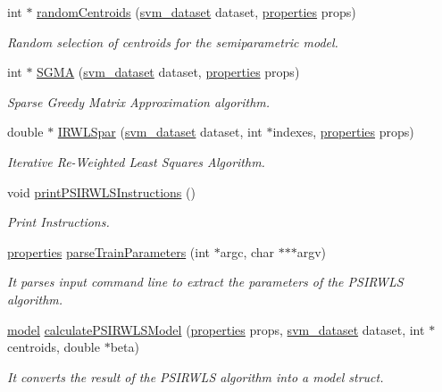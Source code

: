 \begin{DoxyCompactItemize}
\item 
int $\ast$ \hyperlink{PSIRWLS-train_8h_aa6c8aa8b86b7a0647cc679408c310cd3}{random\+Centroids} (\hyperlink{structsvm__dataset}{svm\+\_\+dataset} dataset, \hyperlink{structproperties}{properties} props)
\begin{DoxyCompactList}\small\item\em Random selection of centroids for the semiparametric model. \end{DoxyCompactList}\item 
int $\ast$ \hyperlink{PSIRWLS-train_8h_a50a6e1f36a010feb91db9b9b38679948}{S\+G\+MA} (\hyperlink{structsvm__dataset}{svm\+\_\+dataset} dataset, \hyperlink{structproperties}{properties} props)
\begin{DoxyCompactList}\small\item\em Sparse Greedy Matrix Approximation algorithm. \end{DoxyCompactList}\item 
double $\ast$ \hyperlink{PSIRWLS-train_8h_ad51d9a46645ad0b0bedb1113a3807d24}{I\+R\+W\+L\+Spar} (\hyperlink{structsvm__dataset}{svm\+\_\+dataset} dataset, int $\ast$indexes, \hyperlink{structproperties}{properties} props)
\begin{DoxyCompactList}\small\item\em Iterative Re-\/\+Weighted Least Squares Algorithm. \end{DoxyCompactList}\item 
void \hyperlink{PSIRWLS-train_8h_af71e97e89750872ce608bffd01d2af41}{print\+P\+S\+I\+R\+W\+L\+S\+Instructions} ()
\begin{DoxyCompactList}\small\item\em Print Instructions. \end{DoxyCompactList}\item 
\hyperlink{structproperties}{properties} \hyperlink{PSIRWLS-train_8h_a67566f6fd6aec7278ca360186af4e91b}{parse\+Train\+Parameters} (int $\ast$argc, char $\ast$$\ast$$\ast$argv)
\begin{DoxyCompactList}\small\item\em It parses input command line to extract the parameters of the P\+S\+I\+R\+W\+LS algorithm. \end{DoxyCompactList}\item 
\hyperlink{structmodel}{model} \hyperlink{PSIRWLS-train_8h_a71b4329438bbf3210414315619f7b804}{calculate\+P\+S\+I\+R\+W\+L\+S\+Model} (\hyperlink{structproperties}{properties} props, \hyperlink{structsvm__dataset}{svm\+\_\+dataset} dataset, int $\ast$centroids, double $\ast$beta)
\begin{DoxyCompactList}\small\item\em It converts the result of the P\+S\+I\+R\+W\+LS algorithm into a model struct. \end{DoxyCompactList}\end{DoxyCompactItemize}


